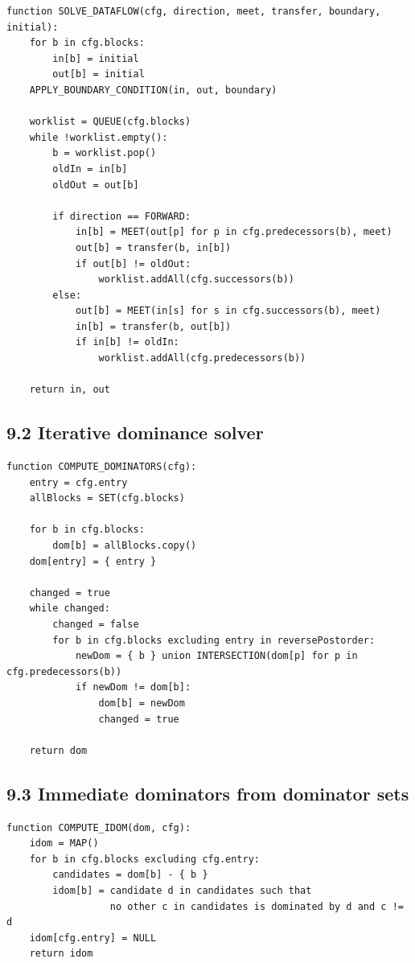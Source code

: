 \documentclass[10pt,letterpaper]{article}
\begin{document}
\begin{verbatim}
function SOLVE_DATAFLOW(cfg, direction, meet, transfer, boundary, initial):
    for b in cfg.blocks:
        in[b] = initial
        out[b] = initial
    APPLY_BOUNDARY_CONDITION(in, out, boundary)

    worklist = QUEUE(cfg.blocks)
    while !worklist.empty():
        b = worklist.pop()
        oldIn = in[b]
        oldOut = out[b]

        if direction == FORWARD:
            in[b] = MEET(out[p] for p in cfg.predecessors(b), meet)
            out[b] = transfer(b, in[b])
            if out[b] != oldOut:
                worklist.addAll(cfg.successors(b))
        else:
            out[b] = MEET(in[s] for s in cfg.successors(b), meet)
            in[b] = transfer(b, out[b])
            if in[b] != oldIn:
                worklist.addAll(cfg.predecessors(b))

    return in, out
\end{verbatim}

\subsection*{9.2 Iterative dominance solver}
{}

\begin{verbatim}
function COMPUTE_DOMINATORS(cfg):
    entry = cfg.entry
    allBlocks = SET(cfg.blocks)

    for b in cfg.blocks:
        dom[b] = allBlocks.copy()
    dom[entry] = { entry }

    changed = true
    while changed:
        changed = false
        for b in cfg.blocks excluding entry in reversePostorder:
            newDom = { b } union INTERSECTION(dom[p] for p in cfg.predecessors(b))
            if newDom != dom[b]:
                dom[b] = newDom
                changed = true

    return dom
\end{verbatim}

\subsection*{9.3 Immediate dominators from dominator sets}
{}

\begin{verbatim}
function COMPUTE_IDOM(dom, cfg):
    idom = MAP()
    for b in cfg.blocks excluding cfg.entry:
        candidates = dom[b] - { b }
        idom[b] = candidate d in candidates such that
                  no other c in candidates is dominated by d and c != d
    idom[cfg.entry] = NULL
    return idom
\end{verbatim}
\end{document}
